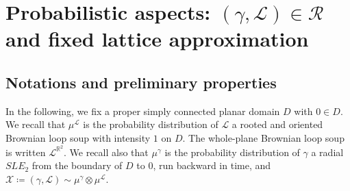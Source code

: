 \documentclass[11pt]{article}
\def\Conf{{\mathscr{R}}}
\begin{document}
\section{Probabilistic aspects: \texorpdfstring{$(\gamma,\mathcal{L})\in \Conf$}{(gamma,L) in R} and fixed lattice approximation}
\label{sec:probabilistic1}
\subsection{Notations and preliminary properties}
In the following, we fix a proper simply connected planar domain $D$ with $0\in D$. We recall that $\mu^{\mathcal{L}}$ is the probability distribution of $\mathcal{L}$ a rooted and oriented Brownian loop soup with intensity $1$ on $D$. The whole-plane Brownian loop soup is written $\mathcal{L}^{\mathbb{R}^2}$. We recall also that $\mu^{\gamma}$ is the probability distribution of $\gamma$ a radial $SLE_2$ from the boundary of $D$ to $0$, run backward in time, and $\mathcal{X}\coloneqq (\gamma,\mathcal{L})\sim \mu^{\gamma}\otimes \mu^{\mathcal{L}}$.
\end{document}
